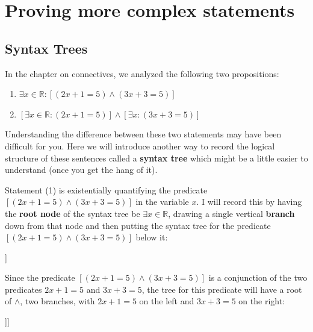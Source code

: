 
\chapter{Proving more complex statements}


\section{Syntax Trees}

In the chapter on connectives, we analyzed the following two propositions:

\begin{enumerate}
	\item $\exists x \in \mathbb{R}: [(2x+1 = 5) \wedge (3x+3 = 5)]$
	
	\item $[\exists x \in \mathbb{R}: (2x+1 = 5)] \wedge [\exists x: (3x+3 = 5)]$
\end{enumerate}

Understanding the difference between these two statements may have been difficult for you.  Here we will introduce another way to record the logical structure of these sentences called a \textbf{syntax tree} which might be a little easier to understand (once you get the hang of it).

Statement (1) is existentially quantifying the predicate $[(2x+1 = 5) \wedge (3x+3 = 5)]$ in the variable $x$.  I will record this by having the \textbf{root node} of the syntax tree be $\exists x \in \mathbb{R}$, drawing a single vertical \textbf{branch} down from that node and then putting the syntax tree for the predicate $[(2x+1 = 5) \wedge (3x+3 = 5)]$ below it:

\begin{center}
	\begin{forest}
		[\(\exists x \in \mathbb{R}\)[Tree for ``\({(2x+1 = 5) \wedge (3x+3 = 5)}\)'']]
	\end{forest}
\end{center}

Since the predicate $[(2x+1 = 5) \wedge (3x+3 = 5)]$ is a conjunction of the two predicates $2x+1 = 5$ and $3x+3 = 5$, the tree for this predicate will have a root of $\wedge$, two branches, with $2x+1 = 5$ on the left and $3x+3 = 5$ on the right:

\begin{center}
	\begin{forest}
		[\(\exists x \in \mathbb{R}\)[\(\wedge\)[\({2x+1 = 5}\)][\({3x+3 = 5}\)]]]
	\end{forest}
\end{center}


